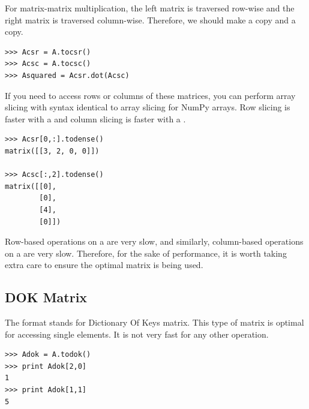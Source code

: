 For matrix-matrix multiplication, the left matrix is traversed row-wise and the
right matrix is traversed column-wise.
Therefore, we should make a  copy and a  copy.

\begin{lstlisting}
>>> Acsr = A.tocsr()
>>> Acsc = A.tocsc()
>>> Asquared = Acsr.dot(Acsc)
\end{lstlisting}

If you need to access rows or columns of these matrices, you can perform array
slicing with syntax identical to array slicing for NumPy arrays.
Row slicing is faster with a  and column slicing is faster with a .

\begin{lstlisting}
>>> Acsr[0,:].todense()
matrix([[3, 2, 0, 0]])

>>> Acsc[:,2].todense()
matrix([[0],
        [0],
        [4],
        [0]])
\end{lstlisting}

Row-based operations on a  are very slow, and similarly, column-based operations on a  are very slow.
Therefore, for the sake of performance, it is worth taking extra care to ensure the optimal matrix is being used.

\subsection*{DOK Matrix} %

The  format stands for Dictionary Of Keys matrix.
This type of matrix is optimal for accessing single elements.
It is not very fast for any other operation.

\begin{lstlisting}
>>> Adok = A.todok()
>>> print Adok[2,0]
1
>>> print Adok[1,1]
5
\end{lstlisting}

